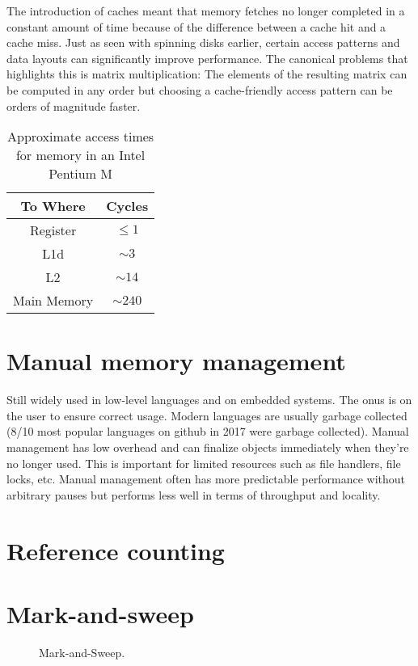 \documentclass[a4paper,oneside]{memoir}
\begin{document}
The introduction of caches meant that memory fetches no longer completed in a
constant amount of time because of the difference between a cache hit and
a cache miss. Just as seen with spinning disks earlier, certain access patterns
and data layouts can significantly improve performance. The canonical problems
that highlights this is matrix multiplication: The elements of the resulting
matrix can be computed in any order but choosing a cache-friendly access pattern
can be orders of magnitude faster.

\begin{table}
  \centering
  \caption{Approximate access times for memory in an Intel Pentium M}
  \begin{tabular}{c | c}
    To Where & Cycles \\ \hline
    Register & $\le 1$ \\
    L1d & $\sim 3$ \\
    L2 & $\sim 14$ \\
    Main Memory & $\sim 240$
  \end{tabular}
\end{table}


\section{Manual memory management}
Still widely used in low-level languages and on embedded systems.
The onus is on the user to ensure correct usage.
Modern languages are usually garbage collected (8/10 most popular languages on
github\cite{GithubLanguages} in 2017 were garbage collected).
Manual management has low overhead and can finalize objects immediately when
they're no longer used. This is important for limited resources such as file
handlers, file locks, etc.
Manual management often has more predictable performance without arbitrary pauses
but performs less well in terms of throughput and locality.

\section{Reference counting}
\section{Mark-and-sweep}
\begin{figure}[b]
  \centering
  
  \caption{Mark-and-Sweep.}
\end{figure}
\end{document}
